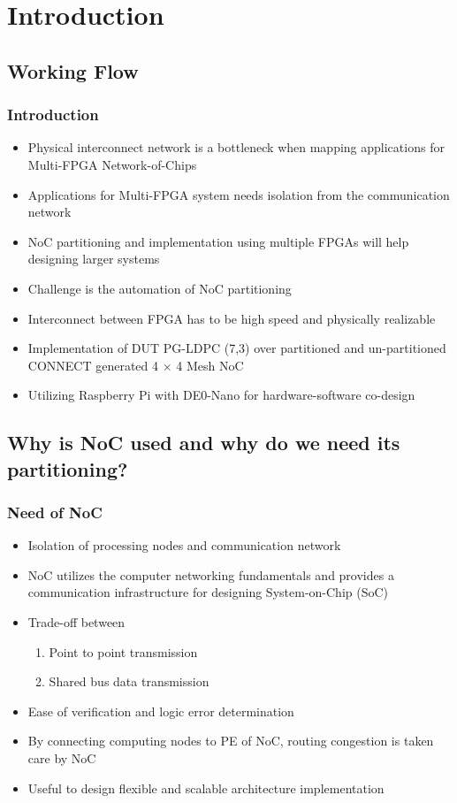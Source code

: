 
\section {Introduction}
\subsection{Working Flow}
\begin{frame}
\frametitle{Introduction}
\footnotesize
\begin {itemize}
\item Physical interconnect network is a bottleneck when mapping applications for Multi-FPGA Network-of-Chips
\item Applications for Multi-FPGA system needs isolation from the communication network
\item NoC partitioning and implementation using multiple FPGAs will help designing larger systems
\item Challenge is the automation of NoC partitioning
\item Interconnect between FPGA has to be high speed and physically realizable
\item Implementation of DUT PG-LDPC (7,3) over partitioned and un-partitioned CONNECT generated 4 $\times$ 4 Mesh NoC
\item Utilizing Raspberry Pi with DE0-Nano for hardware-software co-design 
\end {itemize}
\normalsize
\end{frame}  

\subsection{Why is NoC used and why do we need its partitioning?}
\begin{frame}
\frametitle{Need of NoC}
\footnotesize
\begin{itemize}
\item Isolation of processing nodes and communication network
\item NoC utilizes the computer networking fundamentals and provides a communication infrastructure for designing System-on-Chip (SoC)
\item Trade-off between 
	\begin {enumerate}  
	\item Point to point transmission  
	\item Shared bus data transmission  
	\end {enumerate}
\item Ease of verification and logic error determination
\item By connecting computing nodes to PE of NoC, routing congestion is taken care by NoC
\item Useful to design flexible and scalable architecture implementation
\end{itemize} 
\normalsize
\end{frame}


